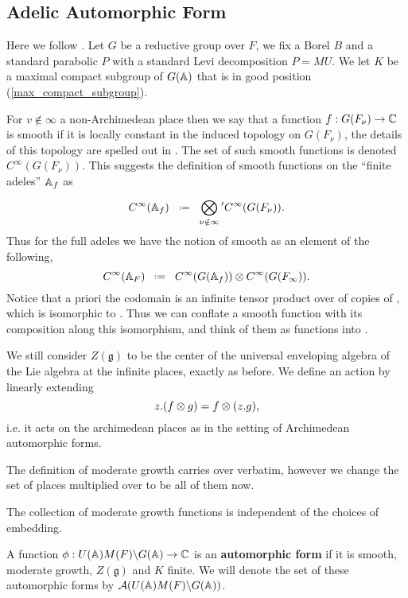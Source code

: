 \subsection{Adelic Automorphic Form}
Here we follow \cite[I.2.17]{moeglinSpectralDecompositionEisenstein1995}. Let \(G\) be a reductive group over \(F\), we fix a Borel \(B\) and a standard parabolic \(P \) with a standard Levi decomposition \(P = MU\). We let \(K\) be a maximal compact subgroup of \(G(\A)\) that is in good position (\ref{max_compact_subgroup}).

For \(v\notin \infty\) a non-Archimedean place then we say that a function \(f: G(F_\nu) \to \C\) is smooth if it is locally constant in the induced topology on \(G(F_\nu)\), the details of this topology are spelled out in \cite{conradWeilGrothendieckApproaches2012}. The set of such smooth functions is denoted \(C^\infty(G(F_\nu))\). This suggests the definition of smooth functions on the ``finite adeles'' \(\A_f\) as 
	\[C^\infty(\mathbb{A}_f) \defeq \bigotimes^{}_{\nu \notin \infty} \phantom{}' C^\infty(G(F_\nu)). \]
	Thus for the full adeles we have the notion of smooth as an element of the following,
	\[C^\infty(\mathbb{A}_F) \defeq   C^\infty(G(\mathbb{A}_f))   \otimes   C^\infty(G(F_\infty)).\]
	Notice that a priori the codomain is an infinite tensor product over \C of copies of \C, which is isomorphic to \C. Thus we can conflate a smooth function with its composition along this isomorphism, and think of them as functions into \C.

	We still consider \(Z(\mathfrak{g})\) to be the center of the universal enveloping algebra of the Lie algebra at the infinite places, exactly as before. We define an action by linearly extending
    \[z.(f\otimes g) = f\otimes (z.g),\]
    i.e. it acts on the archimedean places as in the setting of Archimedean automorphic forms. 
	
	The definition of moderate growth carries over verbatim, however we change the set of places multiplied over to be all of them now.
    
    \begin{remark}
        The collection of moderate growth functions is independent of the choices of embedding. 
    \end{remark}

\begin{definition}
    A function \(\phi: U(\A)M(F)\backslash G(\A) \to \C\) is an \textbf{automorphic form} if it is smooth, moderate growth, \(Z(\mathfrak{g})\) and \(K\) finite. We will denote the set of these automorphic forms by \(\mathcal{A}(U(\A)M(F)\backslash G(\A))\).
\end{definition}

